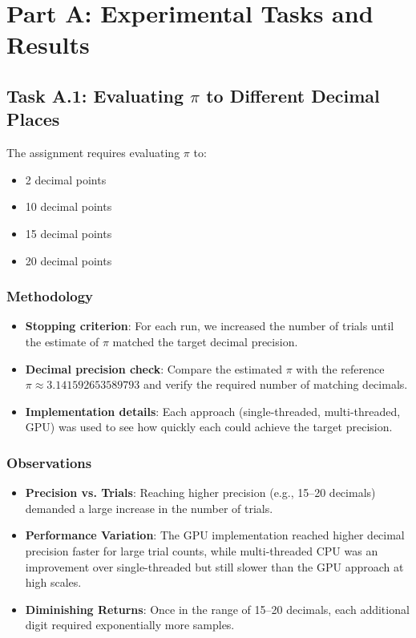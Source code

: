 \documentclass[12pt]{article}
\begin{document}
\section{Part A\texorpdfstring{\@:}{:} Experimental Tasks and Results}

\subsection{Task A.1: Evaluating \texorpdfstring{\(\pi\)}{pi} to Different Decimal Places}
The assignment requires evaluating \(\pi\) to:
\begin{itemize}
    \item 2 decimal points
    \item 10 decimal points
    \item 15 decimal points
    \item 20 decimal points
\end{itemize}
\subsubsection{Methodology}
\begin{itemize}
    \item \textbf{Stopping criterion}: For each run, we increased the number of trials until
          the estimate of \(\pi\) matched the target decimal precision.
    \item \textbf{Decimal precision check}: Compare the estimated \(\pi\) with the reference
          \(\pi \approx 3.141592653589793\) and verify the required number of matching decimals.
    \item \textbf{Implementation details}: Each approach (single-threaded, multi-threaded, GPU)
          was used to see how quickly each could achieve the target precision.
\end{itemize}

\subsubsection{Observations}
\begin{itemize}
    \item \textbf{Precision vs. Trials}: Reaching higher precision (e.g., 15--20 decimals)
          demanded a large increase in the number of trials.
    \item \textbf{Performance Variation}: The GPU implementation reached higher decimal
          precision faster for large trial counts, while multi-threaded CPU was an improvement
          over single-threaded but still slower than the GPU approach at high scales.
    \item \textbf{Diminishing Returns}: Once in the range of 15--20 decimals, each additional
          digit required exponentially more samples.
\end{itemize}
\end{document}
